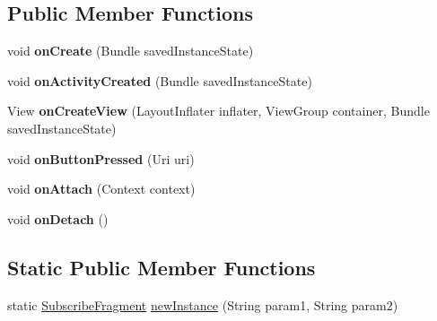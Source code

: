 \subsection*{Public Member Functions}
\begin{DoxyCompactItemize}
\item 
\hypertarget{classcom_1_1example_1_1sel_1_1lostfound_1_1SubscribeFragment_a7f0cd7584a12208f6cc9e3c8fb1fd680}{void {\bfseries on\-Create} (Bundle saved\-Instance\-State)}\label{classcom_1_1example_1_1sel_1_1lostfound_1_1SubscribeFragment_a7f0cd7584a12208f6cc9e3c8fb1fd680}

\item 
\hypertarget{classcom_1_1example_1_1sel_1_1lostfound_1_1SubscribeFragment_a6daae3059443ffda76c69cc51f2d9dec}{void {\bfseries on\-Activity\-Created} (Bundle saved\-Instance\-State)}\label{classcom_1_1example_1_1sel_1_1lostfound_1_1SubscribeFragment_a6daae3059443ffda76c69cc51f2d9dec}

\item 
\hypertarget{classcom_1_1example_1_1sel_1_1lostfound_1_1SubscribeFragment_a521224b1fa6e19b441cd064c636137f1}{View {\bfseries on\-Create\-View} (Layout\-Inflater inflater, View\-Group container, Bundle saved\-Instance\-State)}\label{classcom_1_1example_1_1sel_1_1lostfound_1_1SubscribeFragment_a521224b1fa6e19b441cd064c636137f1}

\item 
\hypertarget{classcom_1_1example_1_1sel_1_1lostfound_1_1SubscribeFragment_a018589e8d66394f7c11ec44d996fbdcf}{void {\bfseries on\-Button\-Pressed} (Uri uri)}\label{classcom_1_1example_1_1sel_1_1lostfound_1_1SubscribeFragment_a018589e8d66394f7c11ec44d996fbdcf}

\item 
\hypertarget{classcom_1_1example_1_1sel_1_1lostfound_1_1SubscribeFragment_adc31ba19040d95af6b9ab1a11677f93d}{void {\bfseries on\-Attach} (Context context)}\label{classcom_1_1example_1_1sel_1_1lostfound_1_1SubscribeFragment_adc31ba19040d95af6b9ab1a11677f93d}

\item 
\hypertarget{classcom_1_1example_1_1sel_1_1lostfound_1_1SubscribeFragment_a756f69f0e7f8f456fbbb077502d9494f}{void {\bfseries on\-Detach} ()}\label{classcom_1_1example_1_1sel_1_1lostfound_1_1SubscribeFragment_a756f69f0e7f8f456fbbb077502d9494f}

\end{DoxyCompactItemize}
\subsection*{Static Public Member Functions}
\begin{DoxyCompactItemize}
\item 
static \hyperlink{classcom_1_1example_1_1sel_1_1lostfound_1_1SubscribeFragment}{Subscribe\-Fragment} \hyperlink{classcom_1_1example_1_1sel_1_1lostfound_1_1SubscribeFragment_ac622c73212970653128ddfb06d38572a}{new\-Instance} (String param1, String param2)
\end{DoxyCompactItemize}


